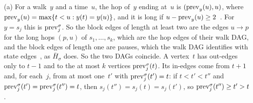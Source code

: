\begin{outline}
(a) For a walk~$y$ and a time~$u$, the hop of~$y$ ending at~$u$ is $(\mathrm{prev}_y(u),u)$, where
$\mathrm{prev}_y(u)=\max\{t<u:y(t)=y(u)\}$, and it is long if $u-\mathrm{prev}_y(u)\ge2$~\cite[Section~2.2]{BoundedNesting2026}. For
$y=s_j$ this is $\mathrm{prev}^\sigma_j$. So the block edges of length at least two are the edges $u\to p$ for the long hops
$(p,u)$ of $s_1,\dots,s_k$, which are the hop edges of their walk DAG, and the block edges of length one are pauses,
which the walk DAG identifies with state edges~\cite[Section~2.3]{BoundedNesting2026}, as $\bar H_\sigma$ does. So the
two DAGs coincide. A vertex~$t$ has out-edges only to $t-1$ and to the at most $k$ vertices $\mathrm{prev}^\sigma_j(t)$. Its
in-edges come from $t+1$ and, for each~$j$, from at most one~$t'$ with $\mathrm{prev}^\sigma_j(t')=t$: if $t<t'<t''$ and
$\mathrm{prev}^\sigma_j(t')=\mathrm{prev}^\sigma_j(t'')=t$, then $s_j(t'')=s_j(t)=s_j(t')$, so $\mathrm{prev}^\sigma_j(t'')\ge t'>t$.


\end{outline}
